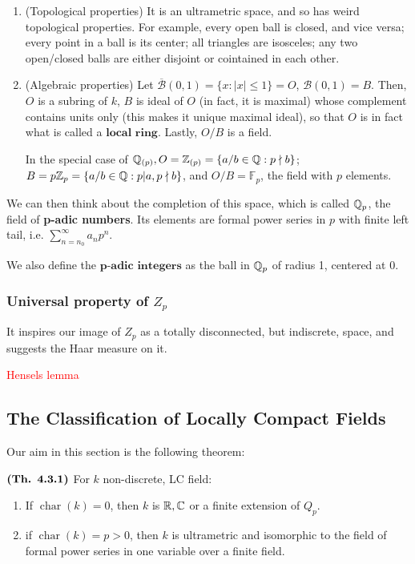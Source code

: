\documentclass{article}
\DeclareMathOperator{\chars}{char}
\begin{document}
\begin{enumerate}
    \item (Topological properties) It is an ultrametric space, and so has weird topological properties. For example, every open ball is closed, and vice versa; every point in a ball is its center; all triangles are isosceles; any two open/closed balls are either disjoint or cointained in each other.
    \item (Algebraic properties) Let $\overline{\mathcal{B}}(0,1) = \{x : |x| \leq 1 \}= O$, $\mathcal{B}(0,1) = B$. Then, $O$ is a subring of $k$, $B$ is ideal of $O$ (in fact, it is maximal) whose complement contains units only (this makes it unique maximal ideal), so that $O$ is in fact what is called a $\textbf{local ring}$. Lastly, $O/B$ is a field.

    In the special case of $\mathbb{Q}_{(p)}, O = \mathbb{Z}_{(p)} = \{ a/b \in \mathbb{Q}: p \nmid b\}$; $B = p\mathbb{Z}_{p} = \{ a/b \in \mathbb{Q}: p | a, p \nmid b \}$, and $O/B = \mathbb{F}_{p}$, the field with $p$ elements. 
\end{enumerate}
We can then think about the completion of this space, which is called $\mathbb{Q}_p$, the field of \textbf{p-adic numbers}. Its elements are formal power series in $p$ with finite left tail, i.e. $\sum_{n = n_0}^{\infty}a_n p^n$.

We also define the $\textbf{p-adic integers}$ as the ball in $\mathbb{Q}_p$ of radius 1, centered at $0$.

\subsubsection*{Universal property of $Z_p$} 
It inspires our image of $Z_p$ as a totally disconnected, but indiscrete, space, and suggests the Haar measure on it.

\textcolor{red}{Hensels lemma}

\subsection{The Classification of Locally Compact Fields}

Our aim in this section is the following theorem:

$\textbf{(Th. 4.3.1)}$ For $k$ non-discrete, LC field:

\begin{enumerate}
    \item If $\chars(k) = 0$, then $k$ is $\mathbb{R}, \mathbb{C}$ or a finite extension of $Q_p$.
    \item if $\chars(k) = p > 0$, then $k$ is ultrametric and isomorphic to the field of formal power series in one variable over a finite field.
\end{enumerate}
\end{document}
